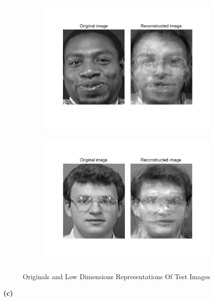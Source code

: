 \begin{homeworkProblem}
\begin{figure}[H]
\begin{subfigure}{0.5\textwidth}
      \includegraphics[width=1.\linewidth]{./images/encoded_5.png}
    \end{subfigure}%
    \begin{subfigure}{0.5\textwidth}
      \centering
      \includegraphics[width=1.\linewidth]{./images/encoded_6.png}
    \end{subfigure}
    \caption{Originals and Low Dimensions Representations Of Test Images}
    \label{fig:recon}
  \end{figure}

  \pagebreak

  \textbf{(c)}
  \\
  \\


\end{homeworkProblem}
